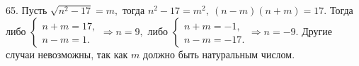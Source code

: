 65. Пусть $\sqrt{n^2-17}=m,$ тогда $n^2-17=m^2,\ (n-m)(n+m)=17.$ Тогда либо $\begin{cases}n+m=17,\\n-m=1.\end{cases}\Rightarrow n=9,$ либо $
\begin{cases}n+m=-1,\\n-m=-17.\end{cases}\Rightarrow n=-9.$ Другие случаи невозможны, так как $m$ должно быть натуральным числом.\\
